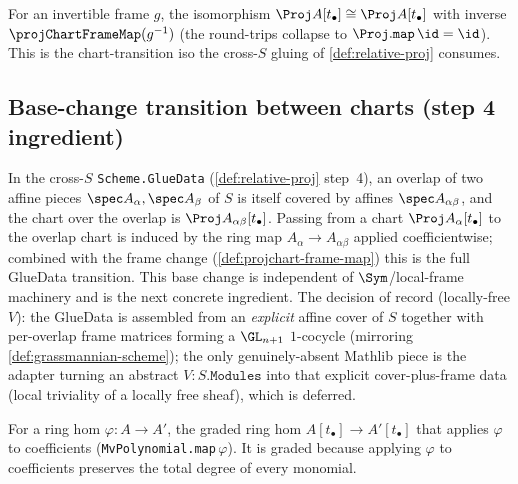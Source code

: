 \begin{definition}

  \label{def:projchart-frame-map-iso}
  For an invertible frame $g$, the isomorphism $\Proj A[t_\bullet]\cong\Proj
  A[t_\bullet]$ with inverse $\projChartFrameMap(g^{-1})$ (the round-trips collapse
  to $\Proj.\mathtt{map}\,\id = \id$). This is the chart-transition iso the cross-$S$
  gluing of \cref{def:relative-proj} consumes.
\end{definition}

\subsection{Base-change transition between charts (step 4 ingredient)}
In the cross-$S$ \texttt{Scheme.GlueData} (\cref{def:relative-proj} step~4), an
overlap of two affine pieces $\spec A_\alpha,\spec A_\beta$ of $S$ is itself
covered by affines $\spec A_{\alpha\beta}$, and the chart over the overlap is
$\Proj A_{\alpha\beta}[t_\bullet]$. Passing from a chart $\Proj A_\alpha[t_\bullet]$
to the overlap chart is induced by the ring map $A_\alpha\to A_{\alpha\beta}$
applied coefficientwise; combined with the frame change
(\cref{def:projchart-frame-map}) this is the full GlueData transition. This base
change is independent of $\Sym$/local-frame machinery and is the next concrete
ingredient. The decision of record (locally-free $V$): the GlueData is assembled
from an \emph{explicit} affine cover of $S$ together with per-overlap frame
matrices forming a $\GL_{n+1}$ $1$-cocycle (mirroring \cref{def:grassmannian-scheme});
the only genuinely-absent Mathlib piece is the adapter turning an abstract
$V:S.\mathtt{Modules}$ into that explicit cover-plus-frame data (local triviality
of a locally free sheaf), which is deferred.

\begin{definition}

  \label{def:projchart-base-hom}
  For a ring hom $\varphi\colon A\to A'$, the graded ring hom
  $A[t_\bullet]\to A'[t_\bullet]$ that applies $\varphi$ to coefficients
  (\texttt{MvPolynomial.map}\,$\varphi$). It is graded because applying $\varphi$ to
  coefficients preserves the total degree of every monomial.
\end{definition}

